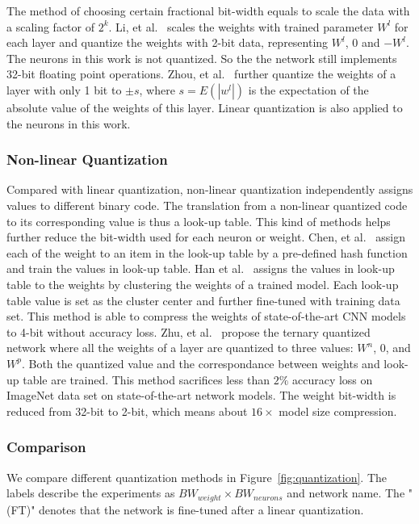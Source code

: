 The method of choosing certain fractional bit-width equals to scale the data with a scaling factor of $2^k$. Li, et al.~\cite{li2016ternary} scales the weights with trained parameter $W^l$ for each layer and quantize the weights with 2-bit data, representing $W^l$, 0 and $-W^l$. The neurons in this work is not quantized. So the the network still implements 32-bit floating point operations. Zhou, et al.~\cite{zhou2016dorefa} further quantize the weights of a layer with only 1 bit to $\pm s$, where $s=E(|w^l|)$ is the expectation of the absolute value of the weights of this layer. Linear quantization is also applied to the neurons in this work.

\subsubsection{Non-linear Quantization}
Compared with linear quantization, non-linear quantization independently assigns values to different binary code. The translation from a non-linear quantized code to its corresponding value is thus a look-up table. This kind of methods helps further reduce the bit-width used for each neuron or weight. Chen, et al.~\cite{chen2015compressing} assign each of the weight to an item in the look-up table by a pre-defined hash function and train the values in look-up table. Han et al.~\cite{han2015deep} assigns the values in look-up table to the weights by clustering the weights of a trained model. Each look-up table value is set as the cluster center and further fine-tuned with training data set. This method is able to compress the weights of state-of-the-art CNN models to 4-bit without accuracy loss. Zhu, et al.~\cite{zhu2016trained} propose the ternary quantized network where all the weights of a layer are quantized to three values: $W^n$, 0, and $W^p$. Both the quantized value and the correspondance between weights and look-up table are trained. This method sacrifices less than $2\%$ accuracy loss on ImageNet data set on state-of-the-art network models. The weight bit-width is reduced from 32-bit to 2-bit, which means about $16\times$ model size compression.

\subsubsection{Comparison}
We compare different quantization methods in Figure~\ref{fig:quantization}. The labels describe the experiments as $BW_{weight}\times BW_{neurons}$ and network name. The "(FT)" denotes that the network is fine-tuned after a linear quantization. 

